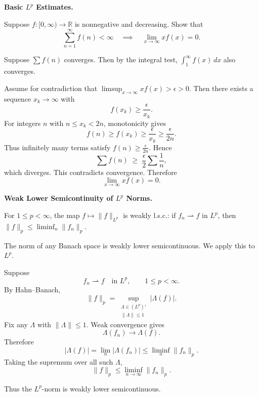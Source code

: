 \begin{problem}[CP-II-0156]
\label{prob:cp-ii-0156}
\textbf{Basic \(L^p\) Estimates.}

\hspace*{1.5em}Suppose $f:[0,\infty)\to\mathbb{R}$ is nonnegative and decreasing.
Show that
\[
\sum_{n=1}^\infty f(n)<\infty \quad\implies\quad \lim_{x\to\infty} x f(x)=0.
\]
\end{problem}

\begin{solution}
Suppose $\sum f(n)$ converges. Then by the integral test, $\int_1^\infty f(x)\,dx$
	also converges.

	Assume for contradiction that $\limsup_{x\to\infty} xf(x)>\epsilon>0$. Then there
	exists a sequence $x_k\to\infty$ with
	\[
	f(x_k)\geq \frac{\epsilon}{x_k}.
	\]
	For integers $n$ with $n\leq x_k<2n$, monotonicity gives
	\[
	f(n)\geq f(x_k)\geq \frac{\epsilon}{x_k}\geq \frac{\epsilon}{2n}.
	\]
	Thus infinitely many terms satisfy $f(n)\geq \tfrac{\epsilon}{2n}$. Hence
	\[
	\sum f(n)\;\geq\;\frac{\epsilon}{2}\sum\frac{1}{n},
	\]
	which diverges. This contradicts convergence. Therefore
	\[
	\lim_{x\to\infty} x f(x)=0.
	\]
\end{solution}

\begin{problem}[CP-II-0157]
\label{prob:cp-ii-0157}
\textbf{Weak Lower Semicontinuity of \(L^p\) Norms.}

\hspace*{1.5em}For $1\le p<\infty$, the map $f\mapsto\|f\|_{L^p}$ is weakly l.s.c.:
		if $f_n\rightharpoonup f$ in $L^p$, then $\|f\|_{p}\le \liminf_n \|f_n\|_{p}$.
\end{problem}

\begin{solution}
The norm of any Banach space is weakly lower semicontinuous. We apply this to \(L^p\).

Suppose
\[
f_n\rightharpoonup f
\quad\text{in }L^p,
\qquad
1\le p<\infty.
\]
By Hahn--Banach,
\[
\|f\|_p
=
\sup_{\substack{\Lambda\in(L^p)'\\\|\Lambda\|\le1}}
|\Lambda(f)|.
\]
Fix any \(\Lambda\) with \(\|\Lambda\|\le1\). Weak convergence gives
\[
\Lambda(f_n)\to\Lambda(f).
\]
Therefore
\[
|\Lambda(f)|
=
\lim_n|\Lambda(f_n)|
\le
\liminf_n\|f_n\|_p.
\]
Taking the supremum over all such \(\Lambda\),
\[
\boxed{
\|f\|_p
\le
\liminf_{n\to\infty}\|f_n\|_p.
}
\]

Thus the \(L^p\)-norm is weakly lower semicontinuous.
\end{solution}


